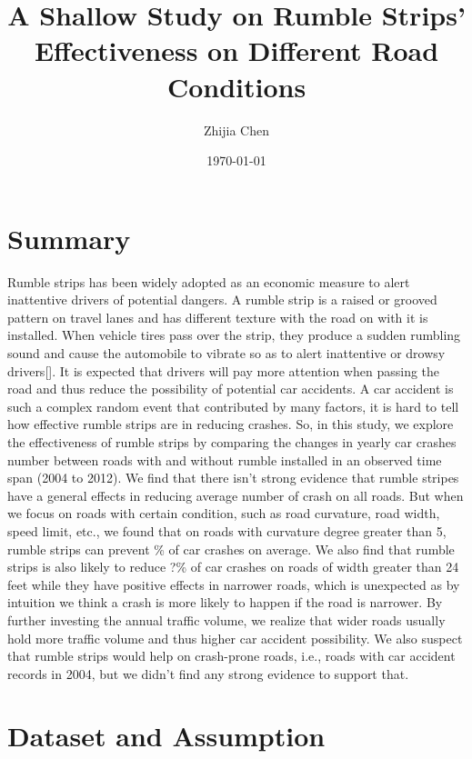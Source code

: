 \documentclass{article}
\title{A Shallow Study on Rumble Strips' Effectiveness on Different Road Conditions}
\author{Zhijia Chen}
\date{\today}
\begin{document}
\begin{titlepage}
    \maketitle
\end{titlepage}

\section*{Summary}
Rumble strips has been widely adopted as an economic measure to alert inattentive drivers of potential dangers. A rumble strip is a raised or grooved pattern on travel lanes and has different texture with the road on with it is installed. When vehicle tires pass over the strip, they produce a sudden rumbling sound and cause the automobile to vibrate so as to alert inattentive or drowsy drivers[]. It is expected that drivers will pay more attention when passing the road and thus reduce the possibility of potential car accidents. A car accident is such a complex random event that contributed by many factors, it is hard to tell how effective rumble strips are in reducing crashes. So, in this study, we explore the effectiveness of rumble strips by comparing the changes in yearly car crashes number between roads with and without rumble installed in an observed time span (2004 to 2012). We find that there isn't strong evidence that rumble stripes have a general effects in reducing average number of crash on all roads. But when we focus on roads with certain condition, such as road curvature, road width, speed limit, etc., we found that on roads with curvature degree greater than 5, rumble strips can prevent \% of car crashes on average. We also find that rumble strips is also likely to reduce ?\% of car crashes on roads of width greater than 24 feet while they have positive effects in narrower roads, which is unexpected as by intuition we think a crash is more likely to happen if the road is narrower. By further investing the annual traffic volume, we realize that wider roads usually hold more traffic volume and thus higher car accident possibility. We also suspect that rumble strips would help on crash-prone roads, i.e., roads with car accident records in 2004, but we didn't find any strong evidence to support that. 

\section*{Dataset and Assumption}
\end{document}

